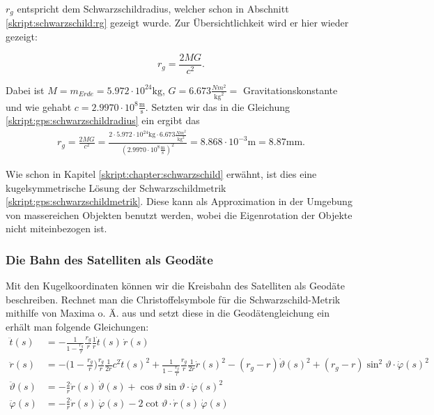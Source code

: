 \begin{refsection}
\noindent{}$r_g$ entspricht dem Schwarzschildradius, welcher schon in Abschnitt \ref{skript:schwarzschild:rg} gezeigt wurde. Zur Übersichtlichkeit wird er hier wieder gezeigt:

\begin{equation}
 r_g=\frac{2MG}{c^2}.
\label{skript:gps:schwarzschildradius}
\end{equation}

\noindent{}Dabei ist \( M = m_{Erde} = 5.972 \cdot 10^{24}\text{kg} \), \( G = 6.673 \frac{Nm^2}{\text{kg}^2} = \) Gravitationskonstante und wie gehabt \( c = 2.9970 \cdot 10^8 \frac{\text{m}}{\text{s}} \). Setzten wir das in die Gleichung \eqref{skript:gps:schwarzschildradius} ein ergibt das\\
\begin{align*}
r_g=\frac{2MG}{c^2} = \frac{2 \cdot 5.972 \cdot 10^{24}\text{kg} \cdot  6.673 \frac{Nm^2}{\text{kg}^2}}{ (2.9970 \cdot 10^8 \frac{\text{m}}{\text{s}})^2} = 8.868 \cdot 10^{-3}\text{m} = 8.87\text{mm.}
\end{align*}

Wie schon in Kapitel \ref{skript:chapter:schwarzschild} erwähnt, ist dies eine kugelsymmetrische Lösung der Schwarzschildmetrik \eqref{skript:gps:schwarzschildmetrik}. Diese kann als Approximation in der Umgebung von massereichen Objekten benutzt werden, wobei die Eigenrotation der Objekte nicht miteinbezogen ist.

\subsubsection{Die Bahn des Satelliten als Geodäte}
Mit den Kugelkoordinaten können wir die Kreisbahn des Satelliten als Geodäte beschreiben. Rechnet man die Christoffelsymbole für die Schwarzschild-Metrik mithilfe von Maxima o. Ä. aus und setzt diese in die Geodätengleichung ein erhält man folgende Gleichungen:
\begin{align*}
\ddot t(s)
&=
-\frac{1}{1-\displaystyle\frac{r_g}{r}}\frac{r_g}{r}\frac{1}{r}\dot t(s)\,\dot r(s)
\\
\ddot r(s)
&=
-\biggl(1-\frac{r_g}{r}\biggr)\frac{r_g}{r}\frac1{2r}c^2\dot t(s)^2
+\frac{1}{1-\displaystyle\frac{r_g}{r}} \frac{r_g}{r}\frac1{2r}\dot r(s)^2
-(r_g-r)\dot \vartheta(s)^2 + (r_g-r)\sin^2 \vartheta \cdot \dot \varphi(s)^2
\\
\ddot \vartheta(s)
&=
-\frac{2}{r} \dot r(s)\, \dot \vartheta(s)
+\cos\vartheta\sin\vartheta \cdot \dot\varphi(s)^2
\\
\ddot \varphi(s)
&=
-\frac{2}{r} \dot r(s)\,\dot \varphi(s)
-2\cot\vartheta \cdot \dot r(s)\,\dot\varphi(s)
\end{align*}


\end{refsection}
